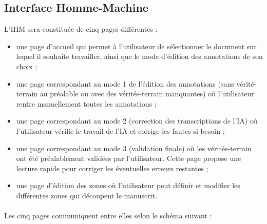 \newpage

\subsection{Interface Homme-Machine}

L’IHM sera constituée de cinq pages différentes :
\begin{itemize}
\item une page d’accueil qui permet à l’utilisateur de sélectionner le document
sur lequel il souhaite travailler, ainsi que le mode d’édition des annotations
de son choix ;
\item une page correspondant au mode 1 de l’édition des annotations
(sans vérité-terrain au préalable ou avec des vérités-terrain manquantes) où
l’utilisateur rentre manuellement toutes les annotations ;
\item une page correspondant au mode 2 (correction des transcriptions de l’IA)
où l’utilisateur vérifie le travail de l’IA et corrige les fautes si besoin ;
\item une page correspondant au mode 3 (validation finale) où les
vérités-terrain ont été préalablement validées par l’utilisateur. Cette page
propose une lecture rapide pour corriger les éventuelles erreurs restantes ;
\item une page d’édition des zones où l’utilisateur peut définir et modifier
les différentes zones qui découpent le manuscrit.
\end{itemize}

\paragraph{}
Les cinq pages communiquent entre elles selon le schéma suivant :

